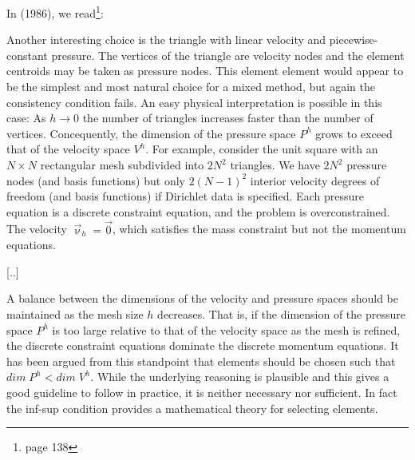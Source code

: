 In \textcite{caod86} (1986), we read\footnote{page 138}:
\begin{displayquote}
{\color{darkgray}
Another interesting choice is the triangle with linear velocity and 
piecewise-constant pressure.
The vertices of the triangle are velocity nodes
and the element centroids may be taken as pressure nodes.
This element element would appear to be the simplest and most natural choice
for a mixed method, but again the consistency condition fails.
An easy physical interpretation is possible in this case:
As $h\rightarrow 0$ the number of triangles increases faster than the number
of vertices. Concequently, the dimension of the pressure space $P^h$
grows to exceed that of the velocity space $V^h$.
For example, consider the unit square with an $N\times N$ rectangular mesh
subdivided into $2N^2$ triangles. We have $2N^2$ pressure nodes
(and basis functions) but only $2(N-1)^2$ interior velocity degrees of freedom
(and basis functions) if Dirichlet data is specified. 
Each pressure equation is a discrete constraint equation, and the 
problem is overconstrained. The velocity $\vec{\upnu}_h=\vec{0}$, which 
satisfies the mass constraint but not the momentum equations.

[..]

A balance between the dimensions of the velocity and pressure spaces
should be maintained as the mesh size $h$ decreases.
That is, if the dimension of the pressure space $P^h$ is too large
relative to that of the velocity space as the mesh is refined,
the discrete constraint equations dominate the discrete momentum equations.
It has been argued from this standpoint that elements should 
be chosen such that $dim\; P^h < dim\; V^h$. 
While the underlying reasoning is plausible and this gives a good 
guideline to follow in practice, it is neither necessary nor sufficient.
In fact the inf-sup condition provides a mathematical theory 
for selecting elements.  
}
\end{displayquote}
 

 
